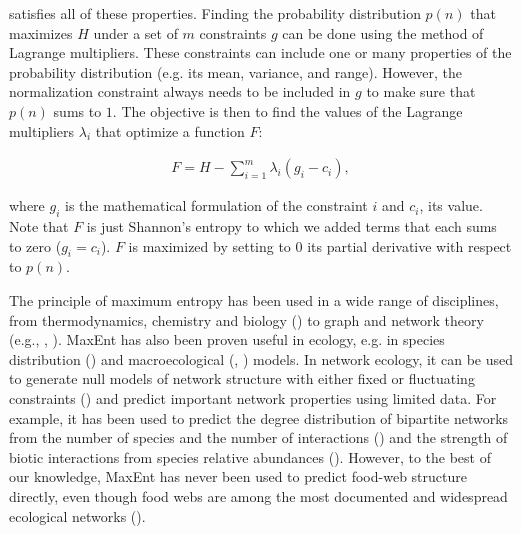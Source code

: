 satisfies all of these properties. Finding the probability distribution $p(n)$
that maximizes $H$ under a set of $m$ constraints $g$ can be done using the
method of Lagrange multipliers. These constraints can include one or many
properties of the probability distribution (e.g. its mean, variance, and range).
However, the normalization constraint always needs to be included in $g$ to make
sure that $p(n)$ sums to $1$. The objective is then to find the values of the
Lagrange multipliers $\lambda_i$ that optimize a function $F$: 

\begin{eqnarray}
  \label{eq:F}
          F = H - \sum_{i=1}^m \lambda_i (g_i-c_i),
\end{eqnarray}
  
where $g_i$ is the mathematical formulation of the constraint $i$ and $c_i$,
its value. Note that $F$ is just Shannon's entropy to which we added terms
that each sums to zero ($g_i = c_i$). $F$ is maximized by setting to $0$ its
partial derivative with respect to $p(n)$. 

The principle of maximum entropy has been used in a wide range of disciplines,
from thermodynamics, chemistry and biology (\cite{Martyushev2006Maximum}) to
graph and network theory (e.g., \cite{Park2004Statistical},
\cite{vanderHoorn2018Sparse}). MaxEnt has also been proven useful in ecology,
e.g. in species distribution (\cite{Phillips2006Maximum}) and macroecological
(\cite{Harte2008Maximum}, \cite{Harte2014Maximum}) models. In network ecology,
it can be used to generate null models of network structure with either fixed or
fluctuating constraints (\cite{Caruso2022Fluctuating}) and predict important
network properties using limited data. For example, it has been used to predict
the degree distribution of bipartite networks from the number of species and the
number of interactions (\cite{Williams2011Biology}) and the strength of biotic
interactions from species relative abundances (\cite{Stock2021Optimal}).
However, to the best of our knowledge, MaxEnt has never been used to predict
food-web structure directly, even though food webs are among the most documented
and widespread ecological networks (\cite{Ings2009Review}).

